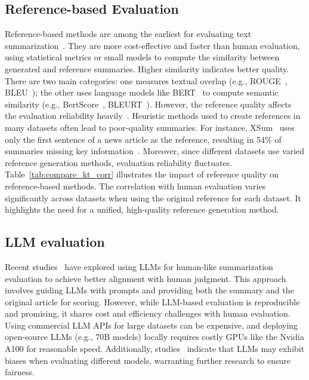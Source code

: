 \subsection{Reference-based Evaluation}
\label{sec:reference eva}
Reference-based methods are among the earliest for evaluating text summarization~\cite{papineni-etal-2002-bleu}. They are more cost-effective and faster than human evaluation, using statistical metrics or small models to compute the similarity between generated and reference summaries. Higher similarity indicates better quality. There are two main categories: one measures textual overlap (e.g., ROUGE~\cite{lin-2004-rouge}, BLEU~\cite{papineni-etal-2002-bleu}); the other uses language models like BERT~\cite{devlin-etal-2019-bert} to compute semantic similarity (e.g., BertScore~\cite{bert-score}, BLEURT~\cite{sellam-etal-2020-bleurt}). However, the reference quality affects the evaluation reliability heavily~\cite{how_well,zhang2024benchmarking}. Heuristic methods used to create references in many datasets often lead to poor-quality summaries. For instance, XSum~\cite{xsum} uses only the first sentence of a news article as the reference, resulting in 54\% of summaries missing key information~\cite{how_well}. Moreover, since different datasets use varied reference generation methods, evaluation reliability fluctuates. Table~\ref{tab:compare_kt_corr} illustrates the impact of reference quality on reference-based methods. The correlation with human evaluation varies significantly across datasets when using the original reference for each dataset. It highlights the need for a unified, high-quality reference generation method.


\subsection{LLM evaluation}
Recent studies~\cite{goyal2022news,kendeer,gao2023human-like,liu2023benchmarking,wang2023chatgpt} have explored using LLMs for human-like summarization evaluation to achieve better alignment with human judgment. This approach involves guiding LLMs with prompts and providing both the summary and the original article for scoring. However, while LLM-based evaluation is reproducible and promising, it shares cost and efficiency challenges with human evaluation. Using commercial LLM APIs for large datasets can be expensive, and deploying open-source LLMs (e.g., 70B models) locally requires costly GPUs like the Nvidia A100 for reasonable speed. Additionally, studies~\cite{not-yet} indicate that LLMs may exhibit biases when evaluating different models, warranting further research to ensure fairness.


